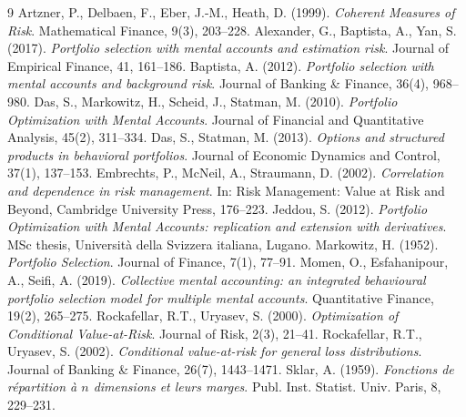\documentclass[11pt]{article}
\begin{document}
\begin{thebibliography}{9}
\small
{} Artzner, P., Delbaen, F., Eber, J.-M., Heath, D. (1999).
\emph{Coherent Measures of Risk}. Mathematical Finance, 9(3), 203--228.
 Alexander, G., Baptista, A., Yan, S. (2017).
\emph{Portfolio selection with mental accounts and estimation risk}.
Journal of Empirical Finance, 41, 161--186.
 Baptista, A. (2012).
\emph{Portfolio selection with mental accounts and background risk}.
Journal of Banking \& Finance, 36(4), 968--980.
 Das, S., Markowitz, H., Scheid, J., Statman, M. (2010).
\emph{Portfolio Optimization with Mental Accounts}.
Journal of Financial and Quantitative Analysis, 45(2), 311--334.
 Das, S., Statman, M. (2013).
\emph{Options and structured products in behavioral portfolios}.
Journal of Economic Dynamics and Control, 37(1), 137--153.
 Embrechts, P., McNeil, A., Straumann, D. (2002).
\emph{Correlation and dependence in risk management}. In: Risk Management:
Value at Risk and Beyond, Cambridge University Press, 176--223.
 Jeddou, S. (2012).
\emph{Portfolio Optimization with Mental Accounts: replication and extension with
derivatives}. MSc thesis, Universit\`a della Svizzera italiana, Lugano.
 Markowitz, H. (1952). \emph{Portfolio Selection}.
Journal of Finance, 7(1), 77--91.
 Momen, O., Esfahanipour, A., Seifi, A. (2019).
\emph{Collective mental accounting: an integrated behavioural portfolio selection
model for multiple mental accounts}. Quantitative Finance, 19(2), 265--275.
 Rockafellar, R.T., Uryasev, S. (2000).
\emph{Optimization of Conditional Value-at-Risk}. Journal of Risk, 2(3), 21--41.
 Rockafellar, R.T., Uryasev, S. (2002).
\emph{Conditional value-at-risk for general loss distributions}.
Journal of Banking \& Finance, 26(7), 1443--1471.
 Sklar, A. (1959). \emph{Fonctions de r\'epartition \`a $n$
dimensions et leurs marges}. Publ. Inst. Statist. Univ. Paris, 8, 229--231.
\end{thebibliography}
\end{document}
